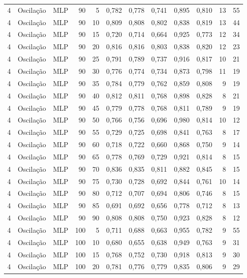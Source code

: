 \begin{longtable}{@{}rllrrrrrrrrr@{}}
4 & Oscilação & MLP & 90 & 5 & 0,782 & 0,778 & 0,741 & 0,895 & 0,810 & 13 & 55 \\
4 & Oscilação & MLP & 90 & 10 & 0,809 & 0,808 & 0,802 & 0,838 & 0,819 & 13 & 44 \\
4 & Oscilação & MLP & 90 & 15 & 0,720 & 0,714 & 0,664 & 0,925 & 0,773 & 12 & 34 \\
4 & Oscilação & MLP & 90 & 20 & 0,816 & 0,816 & 0,803 & 0,838 & 0,820 & 12 & 23 \\
4 & Oscilação & MLP & 90 & 25 & 0,791 & 0,789 & 0,737 & 0,916 & 0,817 & 10 & 21 \\
4 & Oscilação & MLP & 90 & 30 & 0,776 & 0,774 & 0,734 & 0,873 & 0,798 & 11 & 19 \\
4 & Oscilação & MLP & 90 & 35 & 0,784 & 0,779 & 0,762 & 0,859 & 0,808 & 9 & 19 \\
4 & Oscilação & MLP & 90 & 40 & 0,812 & 0,811 & 0,768 & 0,898 & 0,828 & 8 & 21 \\
4 & Oscilação & MLP & 90 & 45 & 0,779 & 0,778 & 0,768 & 0,811 & 0,789 & 9 & 19 \\
4 & Oscilação & MLP & 90 & 50 & 0,766 & 0,756 & 0,696 & 0,980 & 0,814 & 10 & 12 \\
4 & Oscilação & MLP & 90 & 55 & 0,729 & 0,725 & 0,698 & 0,841 & 0,763 & 8 & 17 \\
4 & Oscilação & MLP & 90 & 60 & 0,718 & 0,722 & 0,660 & 0,868 & 0,750 & 9 & 14 \\
4 & Oscilação & MLP & 90 & 65 & 0,778 & 0,769 & 0,729 & 0,921 & 0,814 & 8 & 15 \\
4 & Oscilação & MLP & 90 & 70 & 0,836 & 0,835 & 0,811 & 0,882 & 0,845 & 8 & 15 \\
4 & Oscilação & MLP & 90 & 75 & 0,730 & 0,728 & 0,692 & 0,844 & 0,761 & 10 & 14 \\
4 & Oscilação & MLP & 90 & 80 & 0,712 & 0,707 & 0,694 & 0,806 & 0,746 & 8 & 15 \\
4 & Oscilação & MLP & 90 & 85 & 0,691 & 0,692 & 0,656 & 0,778 & 0,712 & 8 & 13 \\
4 & Oscilação & MLP & 90 & 90 & 0,808 & 0,808 & 0,750 & 0,923 & 0,828 & 8 & 12 \\
4 & Oscilação & MLP & 100 & 5 & 0,711 & 0,688 & 0,663 & 0,955 & 0,782 & 9 & 55 \\
4 & Oscilação & MLP & 100 & 10 & 0,680 & 0,655 & 0,638 & 0,949 & 0,763 & 9 & 31 \\
4 & Oscilação & MLP & 100 & 15 & 0,768 & 0,752 & 0,730 & 0,918 & 0,813 & 9 & 30 \\
4 & Oscilação & MLP & 100 & 20 & 0,781 & 0,776 & 0,779 & 0,835 & 0,806 & 9 & 29 \\

\end{longtable}
